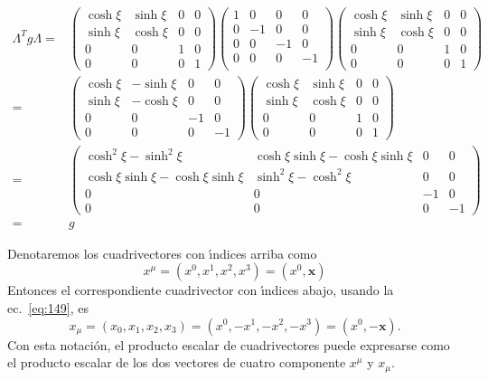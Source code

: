 \begin{align}
  \Lambda^T g \Lambda=&\begin{pmatrix}
    \cosh\xi&\sinh\xi&0&0\\
    \sinh\xi&\cosh\xi&0&0\\
    0     &  0  &1&0\\
    0     &  0  &0&1
  \end{pmatrix}
  \begin{pmatrix}
    1 & 0  & 0 &0\\
    0 & -1 & 0 &0\\
    0 & 0  & -1&0\\
    0 & 0  & 0 &-1\\
  \end{pmatrix}
  \begin{pmatrix}
    \cosh\xi&\sinh\xi&0&0\\
    \sinh\xi&\cosh\xi&0&0\\
    0     &  0  &1&0\\
    0     &  0  &0&1
  \end{pmatrix}\nonumber\\
  =&\begin{pmatrix}
       \cosh\xi&-\sinh\xi&0&0\\
    \sinh\xi&-\cosh\xi&0&0\\
    0     &  0  &-1&0\\
    0     &  0  &0&-1
  \end{pmatrix}
 \begin{pmatrix}
    \cosh\xi&\sinh\xi&0&0\\
    \sinh\xi&\cosh\xi&0&0\\
    0     &  0  &1&0\\
    0     &  0  &0&1
  \end{pmatrix}\nonumber\\
  =&\begin{pmatrix}
       \cosh^2\xi-\sinh^2\xi&\cosh\xi\sinh\xi-\cosh\xi\sinh\xi&0&0\\
    \cosh\xi\sinh\xi-\cosh\xi\sinh\xi&\sinh^2\xi-\cosh^2\xi&0&0\\
    0     &  0  &-1&0\\
    0     &  0  &0&-1
  \end{pmatrix}\nonumber\\
=&g
\end{align}

Denotaremos los cuadrivectores con \'\i ndices arriba como
\begin{equation}
  \label{eq:upindx}
  x^\mu=(x^0,x^1,x^2,x^3)=(x^0,\mathbf{x})
\end{equation}
Entonces el correspondiente cuadrivector con \'\i ndices abajo, usando la ec.~\eqref{eq:149}, es
\begin{equation}
  x_\mu=(x_0,x_1,x_2,x_3)=(x^0,-x^1,-x^2,-x^3)=(x^0,-\mathbf{x}).
\end{equation}
Con esta notaci\'on, el producto escalar de cuadrivectores puede expresarse como el producto escalar de los dos vectores de cuatro componente $x^\mu$ y $x_\mu$.
